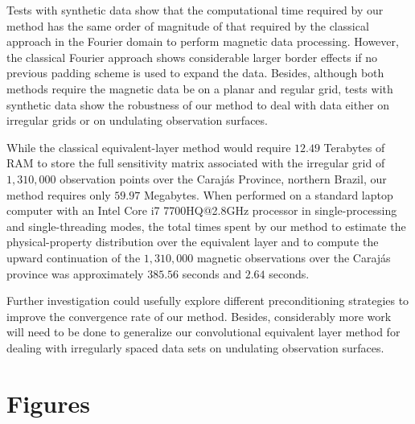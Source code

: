 \documentclass[manuscript]{geophysics}
\begin{document}
	Tests with synthetic data show that the computational time required by our method has 
	the same order of magnitude of that required by the classical approach in the Fourier domain
	to perform magnetic data processing.
	However, the classical Fourier approach shows considerable larger border effects if no previous 
	padding scheme is used to expand the data. 
	Besides, although both methods require the magnetic data be on a planar and regular grid, 
	tests with synthetic data show the robustness of our method to deal with data either on irregular grids
	or on undulating observation surfaces.
	
	While the classical equivalent-layer method would require $12.49$ Terabytes of RAM to store the full
	sensitivity matrix associated with the irregular grid of $1,310,000$ observation points over the
	Carajás Province, northern Brazil, our method requires only $59.97$ Megabytes.
	When performed on a standard laptop computer with an Intel Core i7 7700HQ@2.8GHz processor in
	single-processing and single-threading modes, the total times spent by our method to estimate the
	physical-property distribution over the equivalent layer and to compute the upward continuation
	of the $1,310,000$ magnetic observations over the Carajás province was approximately $385.56$ 
	seconds and $2.64$ seconds.
	
	Further investigation could usefully explore different preconditioning strategies to improve the
	convergence rate of our method. Besides, considerably more work will need to be done to generalize
	our convolutional equivalent layer method for dealing with irregularly spaced data sets on 
	undulating observation surfaces.
	
	\clearpage
	
	\section{Figures}
	
	
\end{document}
